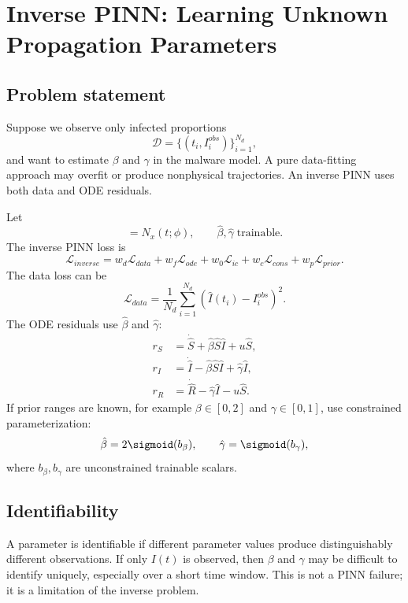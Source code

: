 \documentclass[11pt,a4paper]{article}
\begin{document}
\section{Inverse PINN: Learning Unknown Propagation Parameters}

\subsection{Problem statement}
Suppose we observe only infected proportions
\begin{equation}
    \mathcal{D}=\{(t_i,I_i^{obs})\}_{i=1}^{N_d},
\end{equation}
and want to estimate $\beta$ and $\gamma$ in the malware model. A pure data-fitting approach may overfit or produce nonphysical trajectories. An inverse PINN uses both data and ODE residuals.

Let
\begin{equation}
    [\hat{S}(t),\hat{I}(t),\hat{R}(t)]=N_x(t;\phi), \qquad \hat{\beta},\hat{\gamma}\;\text{trainable}.
\end{equation}
The inverse PINN loss is
\begin{equation}
    \mathcal{L}_{inverse}=w_d\mathcal{L}_{data}+w_f\mathcal{L}_{ode}+w_0\mathcal{L}_{ic}+w_c\mathcal{L}_{cons}+w_p\mathcal{L}_{prior}.
\end{equation}
The data loss can be
\begin{equation}
    \mathcal{L}_{data}=\frac{1}{N_d}\sum_{i=1}^{N_d}\left(\hat{I}(t_i)-I_i^{obs}\right)^2.
\end{equation}
The ODE residuals use $\hat{\beta}$ and $\hat{\gamma}$:
\begin{align}
    r_S &= \dot{\hat{S}} + \hat{\beta}\hat{S}\hat{I}+u\hat{S},\\
    r_I &= \dot{\hat{I}} - \hat{\beta}\hat{S}\hat{I}+\hat{\gamma}\hat{I},\\
    r_R &= \dot{\hat{R}} - \hat{\gamma}\hat{I}-u\hat{S}.
\end{align}
If prior ranges are known, for example $\beta\in[0,2]$ and $\gamma\in[0,1]$, use constrained parameterization:
\begin{equation}
    \hat{\beta}=2\sigmoid(b_\beta),\qquad \hat{\gamma}=\sigmoid(b_\gamma),
\end{equation}
where $b_\beta,b_\gamma$ are unconstrained trainable scalars.

\subsection{Identifiability}
A parameter is identifiable if different parameter values produce distinguishably different observations. If only $I(t)$ is observed, then $\beta$ and $\gamma$ may be difficult to identify uniquely, especially over a short time window. This is not a PINN failure; it is a limitation of the inverse problem.
\end{document}
